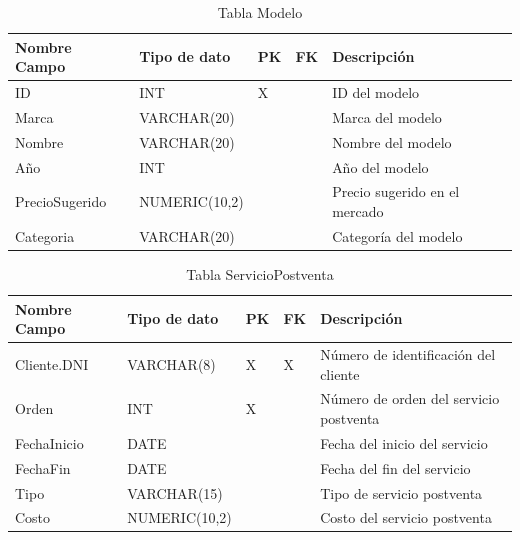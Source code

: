 \documentclass[12pt]{article}
\begin{document}
\begin{table}[htbp]
    \begin{center}
        \begin{tabular}{|p{3cm}|p{3cm}|p{1cm}|p{1cm}|p{6cm}|}
            \hline
            Nombre Campo & Tipo de dato & PK & FK & Descripción \\
            \hline
            ID & INT & X &  & ID del modelo \\
            Marca & VARCHAR(20) &  &  & Marca del modelo \\
            Nombre & VARCHAR(20) &  &  & Nombre del modelo \\
            Año & INT &  &  & Año del modelo \\
            PrecioSugerido & NUMERIC(10,2) &  &  & Precio sugerido en el mercado \\
            Categoria & VARCHAR(20) &  &  & Categoría del modelo \\
            \hline
        \end{tabular}
        \caption{Tabla Modelo}
    \end{center}
\end{table}


\begin{table}[htbp]
    \begin{center}
        \begin{tabular}{|p{3cm}|p{3cm}|p{1cm}|p{1cm}|p{6cm}|}
            \hline
            Nombre Campo & Tipo de dato & PK & FK & Descripción \\
            \hline
            Cliente.DNI & VARCHAR(8) & X & X & Número de identificación del cliente \\
            Orden & INT & X &  & Número de orden del servicio postventa \\
            FechaInicio & DATE &  &  & Fecha del inicio del servicio \\
            FechaFin & DATE &  &  & Fecha del fin del servicio \\
            Tipo & VARCHAR(15) &  &  & Tipo de servicio postventa \\
            Costo & NUMERIC(10,2) &  &  & Costo del servicio postventa \\
            \hline
        \end{tabular}
        \caption{Tabla ServicioPostventa}
    \end{center}
\end{table}
\end{document}
